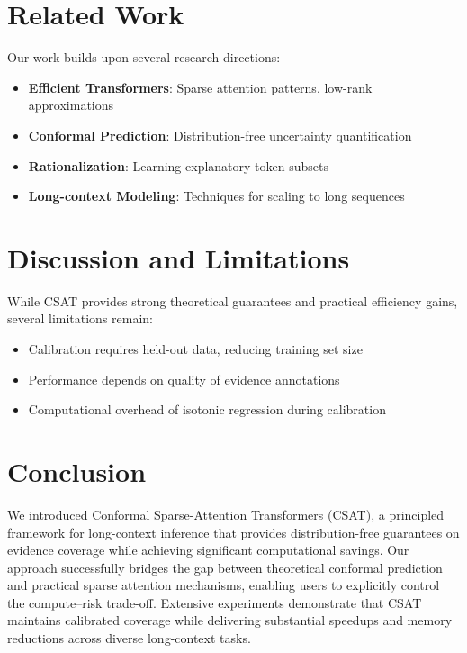 \documentclass[11pt]{article}
\begin{document}
\section{Related Work}

Our work builds upon several research directions:
\begin{itemize}
\item \textbf{Efficient Transformers}: Sparse attention patterns, low-rank approximations
\item \textbf{Conformal Prediction}: Distribution-free uncertainty quantification
\item \textbf{Rationalization}: Learning explanatory token subsets
\item \textbf{Long-context Modeling}: Techniques for scaling to long sequences
\end{itemize}

\section{Discussion and Limitations}

While CSAT provides strong theoretical guarantees and practical efficiency gains, several limitations remain:
\begin{itemize}
\item Calibration requires held-out data, reducing training set size
\item Performance depends on quality of evidence annotations
\item Computational overhead of isotonic regression during calibration
\end{itemize}

\section{Conclusion}

We introduced Conformal Sparse-Attention Transformers (CSAT), a principled framework for long-context inference that provides distribution-free guarantees on evidence coverage while achieving significant computational savings. Our approach successfully bridges the gap between theoretical conformal prediction and practical sparse attention mechanisms, enabling users to explicitly control the compute--risk trade-off. Extensive experiments demonstrate that CSAT maintains calibrated coverage while delivering substantial speedups and memory reductions across diverse long-context tasks.
\end{document}
